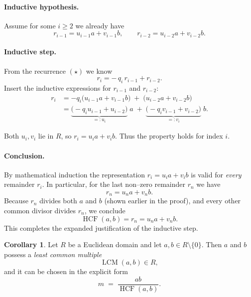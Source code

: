 \documentclass[12pt]{article}
\theoremstyle{definition} %
\newtheorem{corollary}{Corollary}
\theoremstyle{plain} %
\begin{document}
\paragraph{Inductive hypothesis.}
Assume for some \(i\ge2\) we already have
\[
   r_{i-1}=u_{i-1}a+v_{i-1}b,
   \qquad
   r_{i-2}=u_{i-2}a+v_{i-2}b .
\]

\paragraph{Inductive step.}
From the recurrence $(\star)$ we know
\[
   r_i = -\,q_i\,r_{i-1} + r_{i-2}.
\]
Insert the inductive expressions for \(r_{i-1}\) and \(r_{i-2}\):
\[
\begin{aligned}
   r_i
   &= -q_i\bigl(u_{i-1}a+v_{i-1}b\bigr) 
      \;+\;
       \bigl(u_{i-2}a+v_{i-2}b\bigr)\\[4pt]
   &= \underbrace{\bigl(-q_i u_{i-1}+u_{i-2}\bigr)}_{=:u_i}\;a
      \;+\;
      \underbrace{\bigl(-q_i v_{i-1}+v_{i-2}\bigr)}_{=:v_i}\;b .
\end{aligned}
\]

Both \(u_i,v_i\) lie in \(R\), so \(r_i= u_i a+ v_i b\).  
Thus the property holds for index \(i\).

\paragraph{Conclusion.}
By mathematical induction the representation
\(r_i=u_i a+v_i b\) is valid for \emph{every} remainder \(r_i\).
In particular, for the last non–zero remainder \(r_n\) we have
\[
      r_n = u_n a + v_n b .
\]
Because \(r_n\) divides both \(a\) and \(b\) (shown earlier in the proof),
and every other common divisor divides \(r_n\),
we conclude
\[
      \operatorname{HCF}(a,b)=r_n = u_n a + v_n b .
\]
This completes the expanded justification of the inductive step.

\begin{corollary}
  Let \(R\) be a Euclidean domain and let \(a,b\in R\setminus\{0\}\).
  Then \(a\) and \(b\) possess a \emph{least common multiple}
  \[
        \operatorname{LCM}(a,b)\in R,
  \]
  and it can be chosen in the explicit form
  \[
        m \;=\; \frac{ab}{\operatorname{HCF}(a,b)}.
  \]
  \end{corollary}
  
\end{document}

